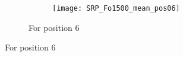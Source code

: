 \begin{figure}
\begin{subfigure}[t]{0.47\textwidth}
\begin{minipage}[t]{\textwidth}
\begin{subfigure}[t]{0.3\textwidth}
        \label{fig:SRP_pos06}
      \end{subfigure}
      \begin{subfigure}[t]{0.3\textwidth}
        \texttt{[image: SRP\_Fo1500\_mean\_pos06]}
        \label{fig:SRP_Fo1500_mean_pos06}
      \end{subfigure}
      \vspace{\verticalSpacingSRPMaps}
      \caption{\centering For position 6}
      \vspace{0.25cm}
    \end{minipage}
  \end{subfigure}


\end{figure}
